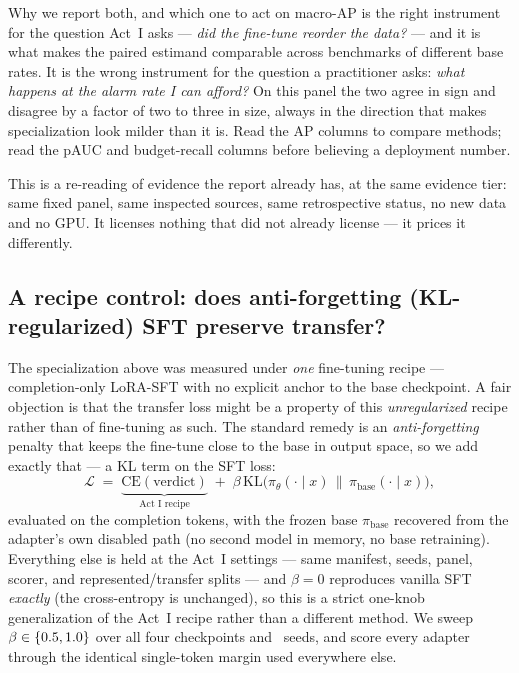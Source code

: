 \begin{takeaway}{Why we report both, and which one to act on}
macro-AP is the right instrument for the question Act~I asks --- \emph{did the fine-tune reorder the
data?} --- and it is what makes the paired estimand comparable across benchmarks of different base
rates. It is the wrong instrument for the question a practitioner asks: \emph{what happens at the
alarm rate I can afford?} On this panel the two agree in sign and disagree by a factor of two to
three in size, always in the direction that makes specialization look milder than it is. Read the
AP columns to compare methods; read the pAUC and budget-recall columns before believing a
deployment number.
\end{takeaway}

\noindent This is a re-reading of evidence the report already has, at the same evidence tier: same
fixed panel, same inspected sources, same retrospective status, no new data and no GPU. It licenses
nothing that  did not already license --- it prices it differently.

\subsection{A recipe control: does anti-forgetting (KL-regularized) SFT preserve transfer?}
\label{sec:actI-klsft}

The specialization above was measured under \emph{one} fine-tuning recipe --- completion-only LoRA-SFT with
no explicit anchor to the base checkpoint. A fair objection is that the transfer loss might be a property of
this \emph{unregularized} recipe rather than of fine-tuning as such. The standard remedy is an
\emph{anti-forgetting} penalty that keeps the fine-tune close to the base in output space, so we add exactly
that --- a KL term on the SFT loss:
\begin{equation}
\mathcal{L} \;=\; \underbrace{\mathrm{CE}(\text{verdict})}_{\text{Act~I recipe}} \;+\;
\beta\,\mathrm{KL}\!\big(\pi_\theta(\cdot\mid x)\,\big\|\,\pi_{\text{base}}(\cdot\mid x)\big),
\label{eq:klsft}
\end{equation}
evaluated on the completion tokens, with the frozen base $\pi_{\text{base}}$ recovered from the adapter's own
disabled path (no second model in memory, no base retraining). Everything else is held at the Act~I settings
--- same manifest, seeds, panel, scorer, and represented/transfer splits --- and $\beta=0$ reproduces vanilla
SFT \emph{exactly} (the cross-entropy is unchanged), so this is a strict one-knob generalization of the Act~I
recipe rather than a different method. We sweep $\beta\in\{0.5, 1.0\}$ over all four checkpoints and
\KLNSeeds\ seeds, and score every adapter through the identical single-token margin used everywhere else.

